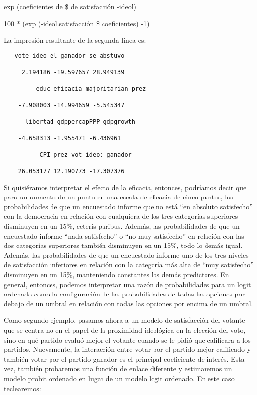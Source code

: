\documentclass[
]{book}
\begin{document}
exp (coeficientes de \$ de satisfacción -ideol)

100 * (exp (-ideol.satisfacción \$ coeficientes) -1)

La impresión resultante de la segunda línea es:

\begin{verbatim}
   vote_ideo el ganador se abstuvo

     2.194186 -19.597657 28.949139

         educ eficacia majoritarian_prez

    -7.908003 -14.994659 -5.545347

      libertad gdppercapPPP gdpgrowth

    -4.658313 -1.955471 -6.436961

          CPI prez vot_ideo: ganador

    26.053177 12.190773 -17.307376
\end{verbatim}

Si quisiéramos interpretar el efecto de la eficacia, entonces, podríamos decir que para un aumento de un punto en una escala de eficacia de cinco puntos, las probabilidades de que un encuestado informe que no está ``en absoluto satisfecho'' con la democracia en relación con cualquiera de los tres categorías superiores disminuyen en un 15\%, ceteris paribus. Además, las probabilidades de que un encuestado informe ``nada satisfecho'' o ``no muy satisfecho'' en relación con las dos categorías superiores también disminuyen en un 15\%, todo lo demás igual. Además, las probabilidades de que un encuestado informe uno de los tres niveles de satisfacción inferiores en relación con la categoría más alta de ``muy satisfecho'' disminuyen en un 15\%, manteniendo constantes los demás predictores. En general, entonces, podemos interpretar una razón de probabilidades para un logit ordenado como la configuración de las probabilidades de todas las opciones por debajo de un umbral en relación con todas las opciones por encima de un umbral.

Como segundo ejemplo, pasamos ahora a un modelo de satisfacción del votante que se centra no en el papel de la proximidad ideológica en la elección del voto, sino en qué partido evaluó mejor el votante cuando se le pidió que calificara a los partidos. Nuevamente, la interacción entre votar por el partido mejor calificado y también votar por el partido ganador es el principal coeficiente de interés. Esta vez, también probaremos una función de enlace diferente y estimaremos un modelo probit ordenado en lugar de un modelo logit ordenado. En este caso teclearemos:
\end{document}
